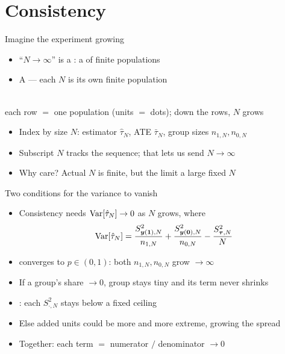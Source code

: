 \documentclass[table, xcolor = {dvipsnames}, 9pt]{beamer}
\theoremstyle{plain}
\newcommand{\mh}[1]{{\color{magenta}{#1}}}
\DeclareMathOperator{\Var}{\rm{Var}}
\begin{document}
\section{Consistency}

\begin{frame}[t]{Imagine the experiment growing}
\vfill
\begin{itemize} \vfill
\item ``$N \to \infty$'' is a \mh{thought experiment}: a \mh{sequence} of finite populations \vfill
\item[] A \mh{triangular array} --- each $N$ is its own finite population \vfill
\end{itemize}
\begin{center}
\\
{\scriptsize each row $=$ one population (units $=$ dots); down the rows, $N$ grows}
\end{center}
\begin{itemize} \vfill
\item Index by size $N$: estimator $\hat{\tau}_N$, ATE $\bar{\tau}_N$, group sizes $n_{1,N}, n_{0,N}$ \vfill
\item[] Subscript $N$ tracks the sequence; that lets us send $N \to \infty$ \vfill
\item Why care? Actual $N$ is finite, but the limit \mh{approximates} a large fixed $N$ \vfill
\end{itemize} \vfill
\end{frame}
\begin{frame}[t]{Two conditions for the variance to vanish}
\vfill
\begin{itemize} \vfill
\item Consistency needs $\Var[\hat{\tau}_N] \to 0$ as $N$ grows, where
\begin{equation*}
\Var[\hat{\tau}_N] = \frac{S^2_{\bm{y}(\bm{1}),N}}{n_{1,N}} + \frac{S^2_{\bm{y}(\bm{0}),N}}{n_{0,N}} - \frac{S^2_{\bm{\tau},N}}{N}
\end{equation*} \vfill
\item \mh{Treated share} converges to $p \in (0,1)$: both $n_{1,N}, n_{0,N}$ grow $\to \infty$ \vfill
\item[] If a group's share $\to 0$, group stays tiny and its term never shrinks \vfill
\item \mh{Bounded PO variance}: each $S^2_{\cdot, N}$ stays below a fixed ceiling \vfill
\item[] Else added units could be more and more extreme, growing the spread \vfill
\item Together: each term $=$ \mh{capped} numerator $/$ \mh{growing} denominator $\to 0$ \vfill
\end{itemize} \vfill
\end{frame}
\end{document}
